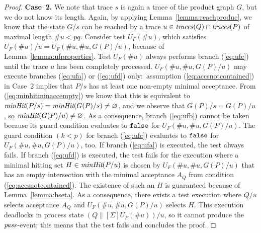 \begin{proof}
\medskip
\noindent
{\bf Case~2.} We note that trace $s$ is again a trace of the product graph
$G$, but we do not know its length. Again, by applying Lemma~\ref{lemma:reachproduc},
we know that the state   $G/s$ can   be reached by a trace
$u\in\text{\it traces}(Q)\cap\text{\it traces}(P)$ of maximal length $\#u < pq$. Consider test $U_F(\#
u)$, which satisfies $U_F(\# u)/u = U_F(\#u,\#u,G(P)/u)$, because of Lemma~\ref{lemma:ufproperties}. Test $U_F(\#u)$   always performs
branch (\ref{eq:ufc}) until the trace $u$ has been completely processed.
$U_F(\#u,\#u,G(P)/u)$ may execute branches (\ref{eq:ufa}) or (\ref{eq:ufd})
only:~assumption (\ref{eq:accsnotcontained}) in Case~2 implies that $P/s$ has
at least one non-empty minimal acceptance. From (\ref{eq:minhitminaccempty})
we know that this is equivalent to $\text{\it minHit}(P/s) = \text{\it minHit}(G(P)/s)\neq\varnothing$, and
we observe that $G(P)/s = G(P)/u$, so $\text{\it minHit}(G(P)/u)\neq\varnothing$.
As a consequence, branch (\ref{eq:ufb}) cannot be taken because its guard condition
evaluates to $\mbox{{\tt false}}$  for $U_F(\#u,\#u,G(P)/u)$.
The guard condition $(k < p)$ for branch (\ref{eq:ufc}) evaluates
to $\mbox{{\tt false}}$ for $U_F(\#u,\#u,G(P)/u)$, too. If branch (\ref{eq:ufa}) is executed, the
test always fails. If branch (\ref{eq:ufd}) is executed, the test fails for
the execution where a minimal hitting set $H\in\text{\it minHit}(P/u)$ is chosen
by $U_F(\#u,\#u,G(P)/u)$ that has an empty intersection with the minimal acceptance
$A_Q$ from condition (\ref{eq:accsnotcontained}). The existence of such an
$H$ is guaranteed because of Lemma~\ref{lemma:hseta}. As a consequence, there
exists a test execution   where $Q/u$ selects acceptance $A_Q$ and
$U_F(\#u,\#u,G(P)/u)$ selects $H$. This execution deadlocks in process state
$(Q\parallel[\Sigma]U_F(\# u))/u$, so it cannot produce the ${\text{\it pass}}$-event;
this  means that the test fails and concludes the proof.
\xbox
\end{proof}

